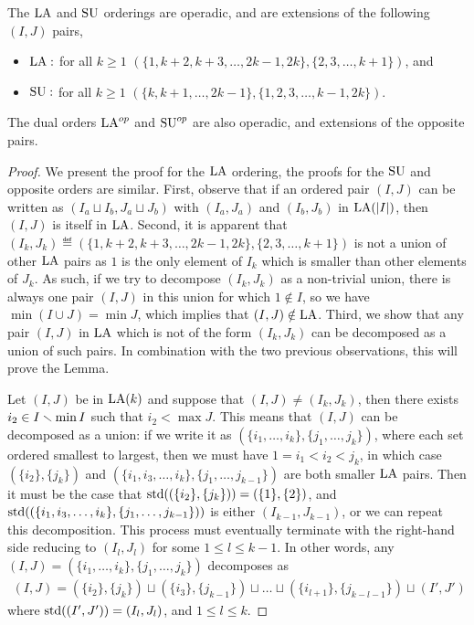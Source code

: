 \begin{lemma} \label{lem:operadic-ordering}
The $\mathrm{LA}$ and $\mathrm{SU}$ orderings are operadic, and are extensions of the following $(I,J)$ pairs,
\begin{itemize}
    \item $\mathrm{LA} :$ for all $k\geq 1$  $(\{1,k+2,k+3,\dots,2k-1,2k\}, \{2,3,\dots,k+1\})$, and 
    \item $\mathrm{SU} :$ for all $k\geq 1$  $(\{k,k+1,\dots,2k-1\},\{1,2,3,\dots,k-1,2k\})$. 
\end{itemize}
The dual orders $\mathrm{LA}^{op}$ and $\mathrm{SU}^{op}$ are also operadic, and extensions of the opposite pairs.
\end{lemma}

\begin{proof}
We present the proof for the $\mathrm{LA}$ ordering, the proofs for the $\mathrm{SU}$ and opposite orders are similar.
First, observe that if an ordered pair $(I,J)$ can be written as $(I_a \sqcup I_b, J_a \sqcup J_b)$ with $(I_a,J_a)$ and $(I_b,J_b)$ in $\mathrm{LA}(|I|)$, then $(I,J)$ is itself in $\mathrm{LA}$.
Second, it is apparent that $(I_k,J_k) \eqdef (\{1,k+2,k+3,\dots,2k-1,2k\}, \{2,3,\dots,k+1\})$ is not a union of other $\mathrm{LA}$ pairs as $1$ is the only element of $I_k$ which is smaller than other elements of $J_k$.
As such, if we try to decompose $(I_k,J_k)$ as a non-trivial union, there is always one pair $(I,J)$ in this union for which $1 \notin I$, so we have $\min ( I \cup J) = \min J$, which implies that $(I,J) \notin \mathrm{LA}$.
Third, we show that any pair $(I,J)$ in $\mathrm{LA}$ which is not of the form $(I_k,J_k)$ can be decomposed as a union of such pairs. 
In combination with the two previous observations, this will prove the Lemma. 

Let $(I,J)$ be in $\mathrm{LA}(k)$ and suppose that $(I,J) \neq (I_k,J_k)$, then there exists $i_2 \in I\smallsetminus \min I$ such that $i_2 < \max J$.
This means that $(I,J)$ can be decomposed as a union: if we write it as $(\{i_1,\dots,i_k\},\{j_1,\dots,j_k\})$, where each set ordered smallest to largest, then we must have $1=i_1<i_2<j_k$, in which case $(\{i_2\},\{j_k\})$ and $(\{i_1,i_3,\dots,i_k\},\{j_1,\dots,j_{k-1}\})$ are both smaller $\mathrm{LA}$ pairs.
Then it must be the case that $\operatorname{std}((\{i_2\},\{j_k\})) = (\{1\},\{2\})$, and $\operatorname{std}((\{i_1,i_3,\dots,i_k\},\{j_1,\dots,j_{k-1}\}))$ is either $(I_{k-1},J_{k-1})$, or we can repeat this decomposition.
This process must eventually terminate with the right-hand side reducing to $(I_l,J_l)$ for some $1 \leq l \leq k-1$.
In other words, any $(I,J) = (\{i_1,\dots,i_k\}, \{j_1,\dots,j_k\})$ decomposes as
\begin{align*}
	(I,J) = (\{i_2\},\{j_k\}) \sqcup (\{i_3\},\{j_{k-1}\}) \sqcup \dots \sqcup (\{i_{l+1} \},\{j_{k-l-1} \}) \sqcup (I',J')
\end{align*}
where $\operatorname{std}((I',J')) = (I_l,J_l)$, and $1\leq l \leq k$.
\end{proof}

